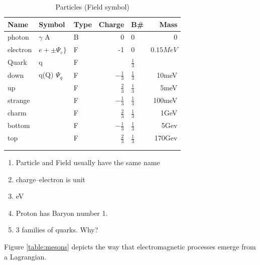 \documentclass[]{article}
\begin{document}
\begin{table}[H]
	\begin{center}
		\caption{Particles (Field symbol)}
		\begin{tabular}{|l|l|l|r|l|r|}\hline
			Name&Symbol&Type&Charge&B\#&Mass\\ \hline
			photon&$\gamma$ A&B&0&0&0 \\ \hline
			electron&$e+\pm \Psi_e\}$&F&-1&0&$0.15MeV$\\ \hline
			Quark&q&F&&$\frac{1}{3}$&\\ \hline
			down&q(Q) $\Psi_q$&F&$-\frac{1}{3}$&$\frac{1}{3}$&10meV\\ \hline
			up&&F&$\frac{2}{3}$&$\frac{1}{3}$&5meV\\ \hline
			strange&&F&$-\frac{1}{3}$&$\frac{1}{3}$&100meV\\ \hline
			charm&&F&$\frac{2}{3}$&$\frac{1}{3}$&1GeV\\ \hline
			bottom&&F&$-\frac{1}{3}$&$\frac{1}{3}$&5Gev\\ \hline
			top&&F&$\frac{2}{3}$&$\frac{1}{3}$&170Gev\\ \hline
			&&&&&\\ \hline
			&&&&&\\ \hline
		\end{tabular}
	\end{center}
\end{table}

\begin{enumerate}
	\item Particle and Field usually have the same name
	\item charge--electron is unit
	\item eV
	\item Proton has Baryon number 1.
	\item 3 families of quarks. Why?
\end{enumerate}

Figure \ref{table:mesons} depicts the way that electromagnetic processes emerge from a Lagrangian.
\end{document}
